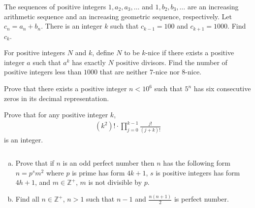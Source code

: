 \begin{problem}
	The sequences of positive integers $1,a_2,a_3,\ldots$ and $1,b_2,b_3,\ldots$ are an increasing arithmetic sequence and an increasing geometric sequence, respectively. Let $c_n=a_n+b_n$. There is an integer $k$ such that $c_{k-1}=100$ and $c_{k+1}=1000$. Find $c_k$. %
\end{problem}

\begin{problem}
	For positive integers $N$ and $k$, define $N$ to be $k$-nice if there exists a positive integer $a$ such that $a^k$ has exactly $N$ positive divisors. Find the number of positive integers less than $1000$ that are neither $7$-nice nor $8$-nice. %
\end{problem}

\begin{problem}[USAJMO 2016]
	Prove that there exists a positive integer $n < 10^6$ such that $5^n$ has six consecutive zeros in its decimal representation. %
\end{problem}

\begin{problem}[USAMO 2016]
	Prove that for any positive integer $k$,
		\begin{align*}
			(k^2)!\cdot\displaystyle\prod_{j=0}^{k-1}\frac{j!}{(j+k)!}
		\end{align*}
	is an integer. %
\end{problem}

\begin{problem}[USAMO 2016]
	$ $
	\begin{enumerate}[(a)]
		\item Prove that if $n$ is an odd perfect number then $n$ has the following form $n=p^sm^2$ where $p$ is prime has form $4k+1$, $s$ is positive integers has form $4h+1$, and $m\in\mathbb{Z}^+$, $m$ is not divisible by $p$.
		\item Find all $n\in\mathbb{Z}^+$, $n>1$ such that $n-1$ and $\frac{n(n+1)}{2}$ is perfect number.
	\end{enumerate}
\end{problem}

